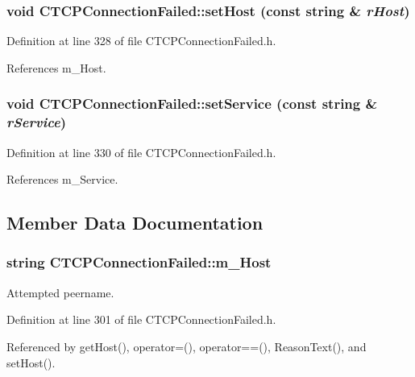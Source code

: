 \subsubsection{\setlength{\rightskip}{0pt plus 5cm}void CTCPConnection\-Failed::set\-Host (const string \& {\em r\-Host})\hspace{0.3cm}{\tt  [inline, protected]}}\label{classCTCPConnectionFailed_b0}




Definition at line 328 of file CTCPConnection\-Failed.h.

References m\_\-Host.
\subsubsection{\setlength{\rightskip}{0pt plus 5cm}void CTCPConnection\-Failed::set\-Service (const string \& {\em r\-Service})\hspace{0.3cm}{\tt  [inline, protected]}}\label{classCTCPConnectionFailed_b1}




Definition at line 330 of file CTCPConnection\-Failed.h.

References m\_\-Service.

\subsection{Member Data Documentation}
\subsubsection{\setlength{\rightskip}{0pt plus 5cm}string CTCPConnection\-Failed::m\_\-Host\hspace{0.3cm}{\tt  [private]}}\label{classCTCPConnectionFailed_o0}


Attempted peername.



Definition at line 301 of file CTCPConnection\-Failed.h.

Referenced by get\-Host(), operator=(), operator==(), Reason\-Text(), and set\-Host().
